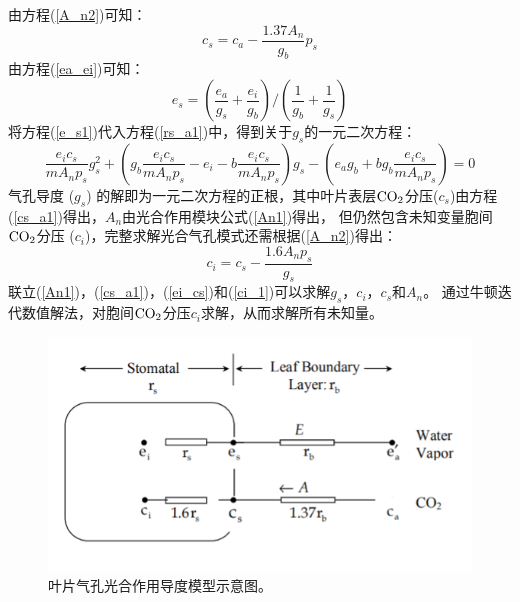 由方程(\ref{A_n2})可知：
\begin{equation}\label{cs_a1}
c_{s}=c_{a}-\frac{1.37 A_{n}}{g_{b}} p_{s}
\end{equation}
由方程(\ref{ea_ei})可知：
\begin{equation}\label{e_s1}
e_{s}=\left(\frac{e_{a}}{g_{s}}+\frac{e_{i}}{g_{b}}\right) /\left(\frac{1}{g_{b}}+\frac{1}{g_{s}}\right)
\end{equation}
将方程(\ref{e_s1})代入方程(\ref{rs_a1})中，得到关于$g_s$的一元二次方程：
\begin{equation}\label{ei_cs}
\frac{e_{i} c_{s}}{m A_{n} p_{s}} g_{s}^{2}+\left(g_{b} \frac{e_{i} c_{s}}{m A_{n} p_{s}}-e_{i}-b \frac{e_{i} c_{s}}{m A_{n} p_{s}}\right) g_{s}
-\left(e_{a} g_{b}+b g_{b} \frac{e_{i} c_{s}}{m A_{n} p_{s}}\right)=0
\end{equation}
气孔导度 ($g_s$) 的解即为一元二次方程的正根，其中叶片表层$\rm CO_2$分压($c_s$)由方程(\ref{cs_a1})得出，$A_n$由光合作用模块公式(\ref{An1})得出，
但仍然包含未知变量胞间$\rm CO_2$分压 ($c_i$)，完整求解光合气孔模式还需根据(\ref{A_n2})得出：
\begin{equation}\label{ci_1}
c_{i}=c_{s}-\frac{1.6 A_{n} p_{s}}{g_{s}}
\end{equation}
联立(\ref{An1})，(\ref{cs_a1})，(\ref{ei_cs})和(\ref{ci_1})可以求解$g_s$，$c_i$，$c_s$和$A_n$。
通过牛顿迭代数值解法，对胞间$\rm CO_2$分压$c_i$求解，从而求解所有未知量。

{
\begin{figure}[]
\centering
\includegraphics{Figures/气孔导度和光合作用/叶片气孔光合作用导度模型示意图.png}
\caption{叶片气孔光合作用导度模型示意图。}
\label{fig:叶片气孔光合作用导度模型示意图}
\end{figure}
}
